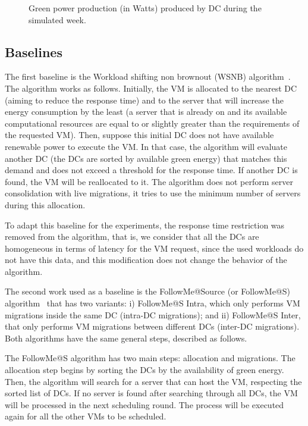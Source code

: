  \begin{figure}[h]
  \centering
   {}
  \caption{Green power production (in Watts) produced by DC during the
  simulated week.}
  \label{fig:green_power}
\end{figure}


\subsection{Baselines}
\label{sec:baselines_smartgreens}

The first baseline is the Workload shifting non brownout (WSNB) algorithm~\cite{XU2020191}. The algorithm works as follows. Initially, the VM is allocated to the nearest DC (aiming to reduce the response time) and to the server that will increase the energy consumption by the least (a server that is already on and its available computational resources are equal to or slightly greater than the requirements of the requested VM). Then, suppose this initial DC does not have available renewable power to execute the VM. In that case, the algorithm will evaluate another DC (the DCs are sorted by available green energy) that matches this demand and does not exceed a threshold for the response time. If another DC is found, the VM will be reallocated to it. The algorithm does not perform server consolidation with live migrations, it tries to use the minimum number of servers during this allocation. 

To adapt this baseline for the experiments, the response time restriction was removed from the algorithm, that is, we consider that all the DCs are homogeneous in terms of latency for the VM request, since the used workloads do not have this data, and this modification does not change the behavior of the algorithm.


The second work used as a baseline is the FollowMe@Source (or FollowMe@S) algorithm~\cite{ALI2021110907} that has two variants: i) FollowMe@S Intra, which only performs VM migrations inside the same DC (intra-DC migrations);  and ii) FollowMe@S Inter, that only performs VM migrations between different DCs (inter-DC migrations). Both algorithms have the same general steps, described as follows.

The FollowMe@S algorithm has two main steps: allocation and migrations. The allocation step begins by sorting the DCs by the availability of green energy. Then, the algorithm will search for a server that can host the VM, respecting the sorted list of DCs. If no server is found after searching through all DCs, the VM will be processed in the next scheduling round. The process will be executed again for all the other VMs to be scheduled. 

